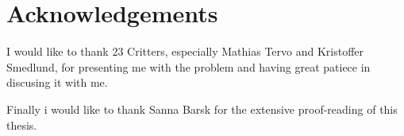 \chapter{Acknowledgements}

I would like to thank 23 Critters, especially Mathias Tervo and Kristoffer Smedlund, for presenting me with the problem and having great patiece in discusing it with me. 


Finally i would like to thank Sanna Barsk for the extensive proof-reading of this thesis. 

